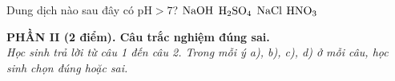 \documentclass[11pt,a4paper]{article}
\begin{document}
\begin{ex}
Dung dịch nào sau đây có $\text{pH} > 7$?
\choice
{\True $\ce{NaOH}$}
{$\ce{H2SO4}$}
{$\ce{NaCl}$}
{$\ce{HNO3}$}

\end{ex}
\vspace{4pt}
\noindent
{\color{mainGreen}\textbf{\Large PHẦN II (2 điểm). Câu trắc nghiệm đúng sai.}}\\
\textit{\small Học sinh trả lời từ câu 1 đến câu 2. Trong mỗi ý a), b), c), d) ở mỗi câu, học sinh chọn đúng hoặc sai.}
\vspace{2pt}
\end{document}
